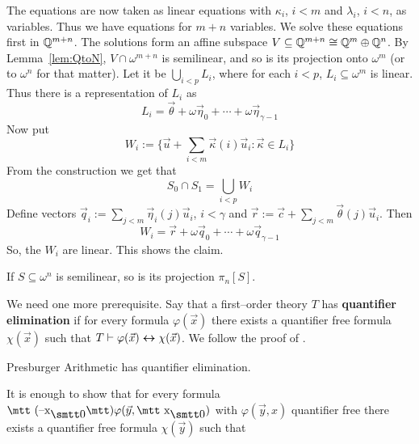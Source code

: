 The equations are now taken as linear equations with $\kappa_i$, 
$i < m$ and $\lambda_i$, $i < n$, as variables. Thus we have 
equations  for $m + n$ variables. We solve these equations first 
in $\mathbb{Q}^{m+n}$. The solutions form an affine subspace $V \subseteq \mathbb{Q}^{m+n} 
\cong \mathbb{Q}^m \oplus \mathbb{Q}^n$. By Lemma~\ref{lem:QtoN}, 
$V \cap \omega^{m+n}$ is semilinear, and so is its projection 
onto $\omega^m$ (or to $\omega^n$ for that matter). Let it be 
$\bigcup_{i < p} L_i$, where for each $i < p$, $L_i \subseteq 
\omega^m$ is linear. Thus there is a representation of $L_i$ as 
\begin{equation}
L_i = \vec{\theta} + \omega \vec{\eta}_0 + \dotsb +
\omega \vec{\eta}_{\gamma-1}
\end{equation}
Now put 
\begin{equation}
W_i := \{\vec{u} + \sum_{i < m} \vec{\kappa}(i) \vec{u}_i : 
	\vec{\kappa} \in L_i\}
\end{equation}
From the construction we get that 
\begin{equation}
S_0 \cap S_1 = \bigcup_{i < p} W_i
\end{equation}
Define vectors $\vec{q}_i := \sum_{j < m} \vec{\eta}_i(j) \vec{u}_i$, 
$i < \gamma$ and $\vec{r} := \vec{c} + \sum_{j < m} \vec{\theta}(j)
\vec{u}_i$. Then 
\begin{equation}
W_i = \vec{r} + \omega \vec{q}_0 + \dotsb + \omega \vec{q}_{\gamma-1}
\end{equation}
So, the $W_i$ are linear. This shows the claim.
\proofend
\begin{lem}
If $S \subseteq \omega^n$ is semilinear, so is its projection $\pi_n[S]$.
\end{lem}
We need one more prerequisite. Say that a first--order theory $T$ has 
\textbf{quantifier elimination} 
if for every formula $\varphi(\vec{x})$ 
there exists a quantifier free formula $\chi(\vec{x})$ such that 
$T \vdash \varphi(\vec{x})\boldsymbol{\leftrightarrow}\chi(\vec{x})$. We follow 
the proof of \cite{monk:logic}. 
\begin{thm}[Presburger]
\label{thm:qe}
Presburger Arithmetic has quantifier elimination. 
\end{thm}
\proofbeg
It is enough to show that for every formula $\mbox{\mtt 
(\symbol{21}x}_{\snull}\mbox{\mtt)}\varphi(\vec{y}, %
\mbox{\mtt x}_{\snull})$ with $\varphi(\vec{y},x)$ quantifier free 
there exists a quantifier free formula $\chi(\vec{y})$ such that 
